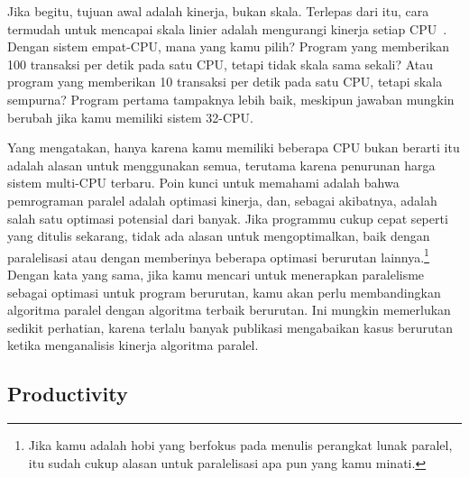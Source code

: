 \QuickQuizEnd

Jika begitu, tujuan awal adalah kinerja, bukan skala.
Terlepas dari itu, cara termudah untuk mencapai skala linier adalah
mengurangi kinerja setiap CPU~\cite{LinusTorvalds2001a}.
Dengan sistem empat-CPU, mana yang kamu pilih?
Program yang memberikan 100 transaksi per detik pada satu CPU,
tetapi tidak skala sama sekali?
Atau program yang memberikan 10 transaksi per detik pada satu CPU,
tetapi skala sempurna?
Program pertama tampaknya lebih baik, meskipun jawaban mungkin berubah
jika kamu memiliki sistem 32-CPU.

Yang mengatakan, hanya karena kamu memiliki beberapa CPU bukan berarti
itu adalah alasan untuk menggunakan semua, terutama karena penurunan
harga sistem multi-CPU terbaru.
Poin kunci untuk memahami adalah bahwa pemrograman paralel adalah
optimasi kinerja, dan, sebagai akibatnya, adalah salah satu optimasi
potensial dari banyak.
Jika programmu cukup cepat seperti yang ditulis sekarang, tidak ada
alasan untuk mengoptimalkan, baik dengan paralelisasi atau dengan
memberinya beberapa optimasi berurutan lainnya.\footnote{
	Jika kamu adalah hobi yang berfokus pada menulis perangkat lunak
	paralel, itu sudah cukup alasan untuk paralelisasi apa pun yang
	kamu minati.}
Dengan kata yang sama, jika kamu mencari untuk menerapkan paralelisme
sebagai optimasi untuk program berurutan, kamu akan perlu membandingkan
algoritma paralel dengan algoritma terbaik berurutan.
Ini mungkin memerlukan sedikit perhatian, karena terlalu banyak publikasi
mengabaikan kasus berurutan ketika menganalisis kinerja algoritma paralel.

\subsection{Productivity}
\label{sec:intro:Productivity}

\EQuickQuizEnd

